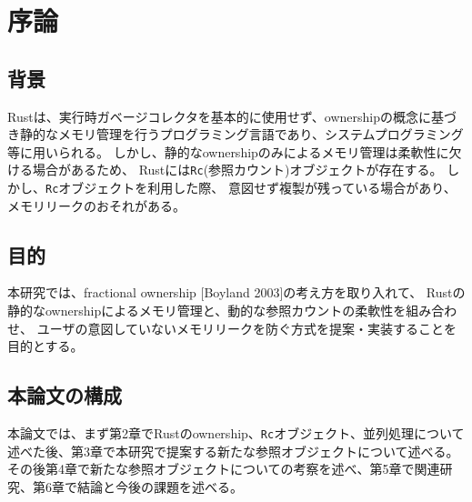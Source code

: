 \documentclass{sumiilab-paper}
\theoremstyle{mystyle}
\numberwithin{definition}{chapter} %
\begin{document}
\begin{abstract}

\end{abstract}

\tableofcontents%

\mainmatter%

\chapter{序論}

\section{背景}
Rustは、実行時ガベージコレクタを基本的に使用せず、ownershipの概念に基づき静的なメモリ管理を行うプログラミング言語であり、システムプログラミング等に用いられる。
しかし、静的なownershipのみによるメモリ管理は柔軟性に欠ける場合があるため、
Rustには\texttt{Rc}(参照カウント)オブジェクトが存在する。
しかし、\texttt{Rc}オブジェクトを利用した際、
意図せず複製が残っている場合があり、
メモリリークのおそれがある。
\section{目的}
本研究では、fractional ownership [Boyland 2003]の考え方を取り入れて、
Rustの静的なownershipによるメモリ管理と、動的な参照カウントの柔軟性を組み合わせ、
ユーザの意図していないメモリリークを防ぐ方式を提案・実装することを目的とする。

\section{本論文の構成}
本論文では、まず第2章でRustのownership、\texttt{Rc}オブジェクト、並列処理について述べた後、第3章で本研究で提案する新たな参照オブジェクトについて述べる。その後第4章で新たな参照オブジェクトについての考察を述べ、第5章で関連研究、第6章で結論と今後の課題を述べる。
\end{document}
